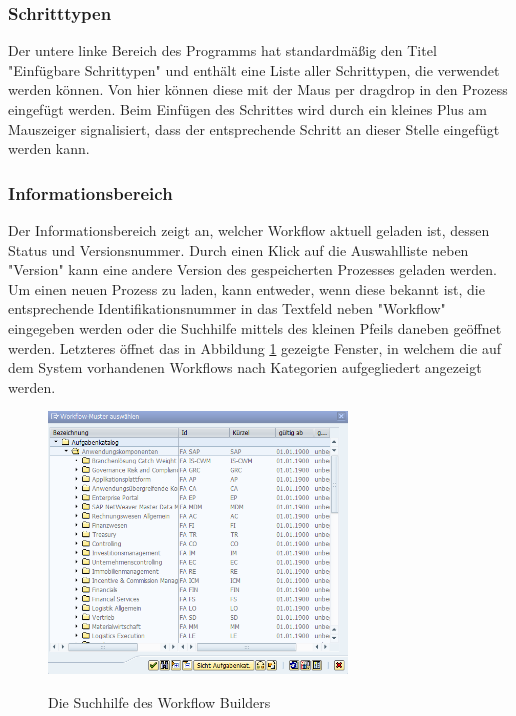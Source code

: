 \subsubsection{Schritttypen}
\label{sec:win-overview-schrittypen}
Der untere linke Bereich des Programms hat standardmäßig den Titel "Einfügbare Schrittypen" und enthält eine Liste aller Schrittypen, die verwendet werden können. Von hier können diese mit der Maus per \gls{dragdrop} in den Prozess eingefügt werden. Beim Einfügen des Schrittes wird durch ein kleines Plus am Mauszeiger signalisiert, dass der entsprechende Schritt an dieser Stelle eingefügt werden kann.

\subsubsection{Informationsbereich}
\label{sec:win-overview-information}
Der Informationsbereich zeigt an, welcher Workflow aktuell geladen ist, dessen Status und Versionsnummer. Durch einen Klick auf die Auswahlliste neben "Version" kann eine andere Version des gespeicherten Prozesses geladen werden. Um einen neuen Prozess zu laden, kann entweder, wenn diese bekannt ist, die entsprechende Identifikationsnummer in das Textfeld neben "Workflow" eingegeben werden oder die Suchhilfe mittels des kleinen Pfeils daneben geöffnet werden. Letzteres öffnet das in Abbildung \ref{abb:workflow-search} gezeigte Fenster, in welchem die auf dem System vorhandenen Workflows nach Kategorien aufgegliedert angezeigt werden.

\begin{figure}[h]
	\begin{center}
	\includegraphics[width=300px]{grafiken/wf-builder_search.png}
	\caption{Die Suchhilfe des Workflow Builders}
	\vspace{-10pt}
	\label{abb:workflow-search}
	\end{center}
\end{figure}

